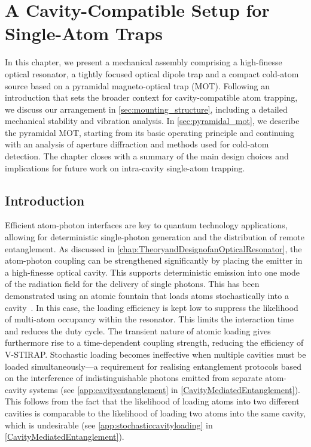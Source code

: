 \documentclass[../Thesis-IJspeert.tex]{subfiles}
\begin{document}
\graphicspath{ {"A Cavity-Compatible Setup for Single-Atom Traps/figs/"} }

\chapter[A Cavity-Compatible Setup for Single-Atom Traps]{A Cavity-Compatible Setup for\\Single-Atom Traps}
\label{chap:CavityCompatibleTrappingArchitectures}
In this chapter, we present a mechanical assembly comprising a high-finesse optical resonator, a tightly focused optical dipole trap and a compact cold-atom source based on a pyramidal magneto-optical trap (MOT). Following an introduction that sets the broader context for cavity-compatible atom trapping, we discuss our arrangement in \autoref{sec:mounting_structure}, including a detailed mechanical stability and vibration analysis. In \autoref{sec:pyramidal_mot}, we describe the pyramidal MOT, starting from its basic operating principle and continuing with an analysis of aperture diffraction and methods used for cold-atom detection. The chapter closes with a summary of the main design choices and implications for future work on intra-cavity single-atom trapping.

\section{Introduction}
Efficient atom-photon interfaces are key to quantum technology applications, allowing for deterministic single-photon generation and the distribution of remote entanglement. As discussed in \autoref{chap:TheoryandDesignofanOpticalResonator}, the atom-photon coupling can be strengthened significantly by placing the emitter in a high-finesse optical cavity. This supports deterministic emission into one mode of the radiation field for the delivery of single photons. This has been demonstrated using an atomic fountain that loads  atoms stochastically into a cavity~\cite{Barrett2019}. In this case, the loading efficiency is kept low to suppress the likelihood of multi-atom occupancy within the resonator. This limits the interaction time and reduces the duty cycle. The transient nature of atomic loading gives furthermore rise to a time-dependent coupling strength, reducing the efficiency of V-STIRAP. Stochastic loading becomes ineffective when multiple cavities must be loaded simultaneously---a requirement for realising entanglement protocols based on the interference of indistinguishable photons emitted from separate atom-cavity systems (see \autoref{app:cavityentanglement} in \autoref{CavityMediatedEntanglement}). This follows from the fact that the likelihood of loading atoms into two different cavities is comparable to the likelihood of loading two atoms into the same cavity, which is undesirable (see \autoref{app:stochasticcavityloading} in \autoref{CavityMediatedEntanglement}).
\end{document}
